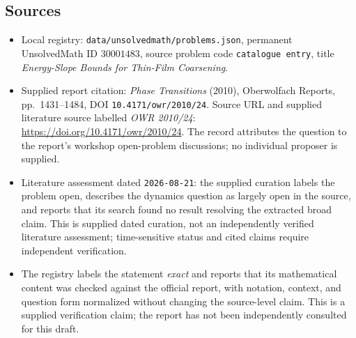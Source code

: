 \documentclass[11pt]{article}
\begin{document}
\subsection{Sources}
\begin{itemize}
\item Local registry: \texttt{data/unsolvedmath/problems.json}, permanent UnsolvedMath ID \(30001483\), source problem code \texttt{catalogue entry}, title \emph{Energy-Slope Bounds for Thin-Film Coarsening}.
\item Supplied report citation: \emph{Phase Transitions} (2010), Oberwolfach Reports, pp.\ 1431--1484, DOI \texttt{10.4171/owr/2010/24}. Source URL and supplied literature source labelled \emph{OWR 2010/24}: \url{https://doi.org/10.4171/owr/2010/24}. The record attributes the question to the report's workshop open-problem discussions; no individual proposer is supplied.
\item Literature assessment dated \texttt{2026-08-21}: the supplied curation labels the problem open, describes the dynamics question as largely open in the source, and reports that its search found no result resolving the extracted broad claim. This is supplied dated curation, not an independently verified literature assessment; time-sensitive status and cited claims require independent verification.
\item The registry labels the statement \emph{exact} and reports that its mathematical content was checked against the official report, with notation, context, and question form normalized without changing the source-level claim. This is a supplied verification claim; the report has not been independently consulted for this draft.
\end{itemize}
\end{document}
